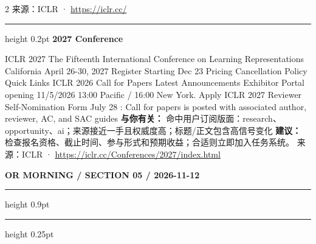 \documentclass[10.5pt]{ctexart}
\begin{document}
\begin{multicols}{2}
{\footnotesize\color{ormuted} 来源：ICLR · \url{https://iclr.cc/}}
\vspace{2mm}
\hrule height 0.2pt
\vspace{2mm}
{\large\bfseries 2027 Conference}\par
ICLR 2027 The Fifteenth International Conference on Learning Representations California April 26-30, 2027 Register Starting Dec 23 Pricing Cancellation Policy Quick Links ICLR 2026 Call for Papers Latest Announcements Exhibitor Portal opening 11/5/2026 13:00 Pacific / 16:00 New York. Apply ICLR 2027 Reviewer Self-Nomination Form July 28 : Call for papers is posted with associated author, reviewer, AC, and SAC guides 
\textbf{与你有关：} 命中用户订阅版面：research、opportunity、ai；来源接近一手且权威度高；标题/正文包含高信号变化
\textbf{建议：} 检查报名资格、截止时间、参与形式和预期收益；合适则立即加入任务系统。
{\footnotesize\color{ormuted} 来源：ICLR · \url{https://iclr.cc/Conferences/2027/index.html}}
\end{multicols}
\newpage
{\small\bfseries OR MORNING / SECTION 05 / 2026-11-12}
\vspace{2mm}
\hrule height 0.9pt
\vspace{1.5mm}
\hrule height 0.25pt
\vspace{4mm}
\end{document}
